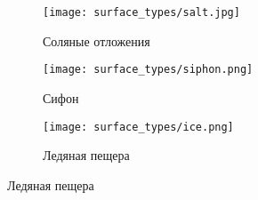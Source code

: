 \begin{figure}[H]
  \begin{subfigure}[b]{0.3\textwidth}
      \centering\texttt{[image: surface\_types/salt.jpg]}\\
      \caption{Соляные отложения}
      \label{fig:surface_types/salt}
  \end{subfigure}
  \hfill
  \begin{subfigure}[b]{0.3\textwidth}
      \centering\texttt{[image: surface\_types/siphon.png]}\\
      \caption{Сифон}
      \label{fig:surface_types/syphon}
  \end{subfigure}
  \hfill
  \begin{subfigure}[b]{0.3\textwidth}
      \centering\texttt{[image: surface\_types/ice.png]}\\
      \caption{Ледяная пещера}
      \label{fig:surface_types/ice}
  \end{subfigure}


\end{figure}
